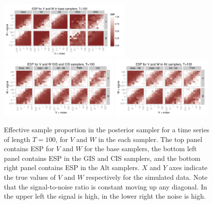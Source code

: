 \documentclass{article}
\begin{document}
\begin{figure}[!h]
\centering
\includegraphics[width=0.59\textwidth]{basecisESplot100}
\includegraphics[width=0.53\textwidth]{altintESplotV100}
\includegraphics[width=0.45\textwidth]{altintESplotW100}
\caption{Effective sample proportion in the posterior sampler for a time series of length $T=100$, for $V$ and $W$ in the each sampler. The top panel contains ESP for $V$ and $W$ for the base samplers, the bottom left panel contains ESP in the GIS and CIS samplers, and the bottom right panel contains ESP in the Alt samplers. $X$ and $Y$ axes indicate the true values of $V$ and $W$ respectively for the simulated data. Note that the signal-to-noise ratio is constant moving up any diagonal. In the upper left the signal is high, in the lower right the noise is high.}
\label{ESplot2}
\end{figure}
\end{document}
